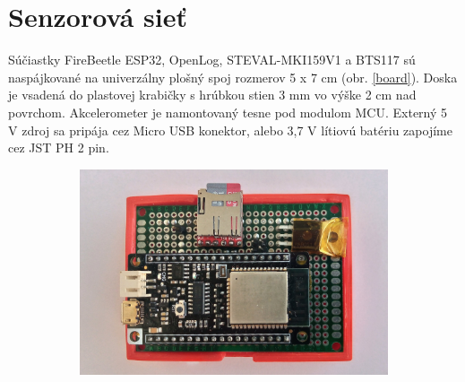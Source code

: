 \section{Senzorová sieť}
Súčiastky FireBeetle ESP32, OpenLog, STEVAL-MKI159V1 a BTS117 sú naspájkované na univerzálny plošný spoj rozmerov 5 x 7 cm
(obr. \ref{board}). Doska je vsadená do plastovej krabičky s hrúbkou stien 3 mm vo výške 2 cm nad povrchom.
Akcelerometer je namontovaný tesne pod modulom MCU. Externý 5 V zdroj sa pripája cez Micro USB konektor, alebo 3,7 V lítiovú batériu
zapojíme cez JST PH 2 pin.
\begin{figure}[h!]
\centering
\begin{subfigure}{0.6\textwidth}
    \centering
    \includegraphics[width=\textwidth]{figures/design/esp32.jpg}
\end{subfigure}
\begin{subfigure}{0.2\textwidth}
    \centering

\end{subfigure}
\end{figure}
